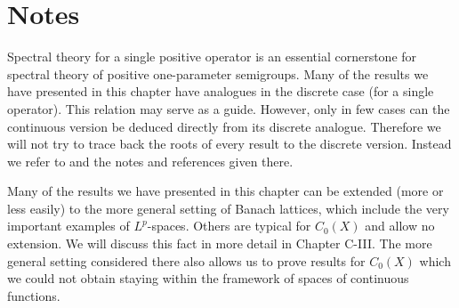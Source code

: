 \clearpage
\section*{Notes}
Spectral theory for a single positive operator is an essential cornerstone for spectral theory of positive one-parameter semigroups.
Many of the results we have presented in this chapter have analogues in the discrete case (\ie for a single operator).
This relation may serve as a guide.
However, only in few cases can the continuous version be deduced directly from its discrete analogue.
Therefore we will not try to trace back the roots of every result to the discrete version.
Instead we refer to \citet{schaefer:1974} and the notes and references given there.

Many of the results we have presented in this chapter can be extended (more or less easily) to the more general setting of Banach lattices, which include the very important examples of $L^p$-spaces.
Others are typical for $C_{0}(X)$ and allow no extension.
We will discuss this fact in more detail in Chapter C-III.
The more general setting considered there also allows us to prove results for $C_{0}(X)$ which we could not obtain staying within the framework of spaces of continuous functions.

